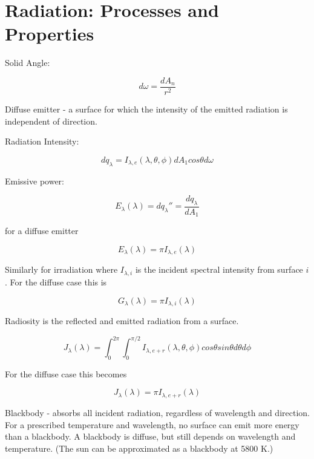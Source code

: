 \documentclass[paper=letter, fontsize=11pt]{scrartcl}
\numberwithin{equation}{section}        %
\numberwithin{figure}{section}          %
\numberwithin{table}{section}               %
\begin{document}
\section{Radiation: Processes and Properties}

Solid Angle:

\begin{equation}
d\omega = \frac{dA_n}{r^2}
\end{equation}

Diffuse emitter - a surface for which the intensity of the emitted radiation is independent of direction.

Radiation Intensity:

\begin{equation}
dq_\lambda = I_{\lambda,e}(\lambda,\theta,\phi)dA_1cos\theta d\omega
\end{equation}

Emissive power:

\begin{equation}
E_\lambda(\lambda) = dq_\lambda'' = \frac{dq_\lambda}{dA_1}
\end{equation}

\noindent for a diffuse emitter

\begin{equation}
E_\lambda(\lambda) = \pi I_{\lambda,e}(\lambda)
\end{equation}

Similarly for irradiation where $I_{\lambda,i}$ is the incident spectral intensity from surface $i$. For the diffuse case this is

\begin{equation}
G_\lambda(\lambda) = \pi I_{\lambda,i}(\lambda)
\end{equation}

Radiosity is the reflected and emitted radiation from a surface.

\begin{equation}
J_\lambda(\lambda) = \int_0^{2\pi}\int_0^{\pi/2} I_{\lambda,e+r}(\lambda,\theta,\phi)cos\theta sin\theta d\theta d\phi
\end{equation}

\noindent For the diffuse case this becomes

\begin{equation}
J_\lambda(\lambda) = \pi I_{\lambda,e+r}(\lambda)
\end{equation}

Blackbody - absorbs all incident radiation, regardless of wavelength and direction. For a prescribed temperature and wavelength, no surface can emit more energy than a blackbody. A blackbody is diffuse, but still depends on wavelength and temperature. (The sun can be approximated as a blackbody at 5800 K.)
\end{document}
